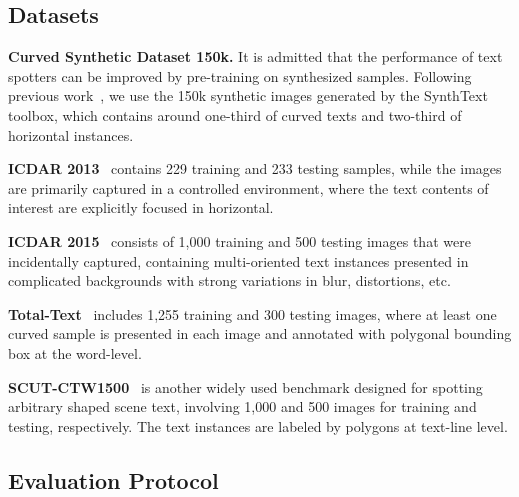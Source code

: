 \documentclass[sigconf]{acmart}
\begin{document}
\subsection{Datasets} 
    
{\bf Curved Synthetic Dataset 150k.} 
It is admitted that the performance of text spotters can be improved by pre-training on synthesized samples. Following previous work~\cite{liu2020abcnet}, we use the 150k synthetic images generated by the SynthText~\cite{gupta2016synthetic} toolbox, which contains around one-third of curved texts and two-third of horizontal instances.

{\bf ICDAR 2013}~\cite{karatzas2013icdar} 
contains 229 training and 233 testing samples, while the images are primarily captured in a controlled environment, where the text contents of interest are explicitly focused in horizontal.

    
{\bf ICDAR 2015}~\cite{karatzas2015icdar} 
consists of 1,000 training and 500 testing images that were incidentally captured, containing multi-oriented text instances presented in complicated backgrounds with strong variations in blur, distortions, etc.
    

{\bf Total-Text}~\cite{ch2017total} 
includes 1,255 training and 300 testing images, where at least one curved sample is presented in each image and annotated with polygonal bounding box at the word-level.
    
{\bf SCUT-CTW1500}~\cite{liu2019curved} 
is another widely used benchmark designed for spotting arbitrary shaped scene text, involving 1,000 and 500 images for training and testing, respectively. The text instances are labeled by polygons at text-line level.
    


\subsection{Evaluation Protocol}
\label{subsec:eval_protocol}
    
    
\end{document}
